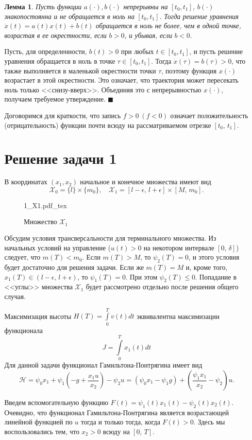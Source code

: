 \documentclass[16pt]{article}
\newcommand{\incfig}[2]{%
    \def\svgwidth{#2 mm}
    {#1.pdf_tex}
}
\newtheorem{Lem}{Лемма}
\newenvironment{Proof}{\par\noindent{\bf Доказательство.}}{\hfill$\scriptstyle\blacksquare$}
\newcommand\A{(\cdot)}
\newcommand\Int[2]{\int\limits_{#1}^{#2}}
\newcommand\X{\mathcal{X}}
\newcommand\Pict[3]{
\begin{figure}[h!]
    \centering
    \incfig{#1}{#3}
    \caption{#2}
    \label{fig:#1}
\end{figure}
}
\begin{document}
\begin{Lem}
Пусть функции $a\A, b\A$ непрерывны на $[t_0, t_1]$, $b\A$ знакопостоянна и не обращается в ноль на $[t_0, t_1]$.
Тогда решение уравнения $\dot{x}(t) = a(t)x(t) + b(t)$ обращается в ноль не более, чем в одной точке, возрастая в ее  окрестности, если $b > 0$, и убывая, если $b < 0$.
\end{Lem}
\begin{Proof}
Пусть, для определенности, $b(t) > 0$ при любых $t \in [t_0, t_1]$, и пусть решение уравнения обращается в ноль
в точке $\tau \in [t_0, t_1]$. Тогда $\dot{x}(\tau) = b(\tau) > 0$, что также выполняется в маленькой окрестности точки $\tau$, поэтому функция $x\A$ возрастает в этой окрестности.
Это означает, что траектория может пересекать ноль только <<снизу-вверх>>. Объединяя это с непрерывностью $x\A$,
получаем требуемое утверждение.
\end{Proof}

Договоримся для краткости, что запись $f > 0 \ (f < 0)$ означает положительность (отрицательность)
 функции почти всюду на рассматриваемом отрезке 
$[t_0,\,t_1]$.
\section{Решение задачи 1}
В координатах $(x_1, x_2)$ начальное и конечное множества имеют вид
$$\X_0 = \{l\} \times \{m_0\}, \quad \X_1 = [l-\epsilon, \, l+\epsilon] \times [M, \, m_0].$$
\Pict{1_X1}{Множество $\X_1$}{90}

Обсудим условия трансверсальности для терминального множества. Из начальных условий на управление ($u(t) > 0$ на 
некотором интервале $[0,\,\delta]$) следует, что $m(T) < m_0$. Если $m(T) > M$, то $\psi_2(T) = 0$, и этого условия
будет достаточно для решения задачи. Если же $m(T) = M$ и, кроме того, $x_1(T) \in (l-\epsilon,\, l+\epsilon)$, то
$\psi_1(T) = 0$. При этом $\psi_2(T) \leqslant 0$. Попадание в <<углы>> множества $\X_1$ будет рассмотрено отдельно
после решения общего случая.

Максимизация высоты $H(T) = \Int{0}{T}v(t)dt$ эквивалентна максимизации функционала $$J = \Int{0}{T}x_1(t)dt$$
Для данной задачи функционал Гамильтона-Понтрягина имеет вид 
$$\mathcal{H} = \psi_0x_1 + \psi_1\left(-g + \frac{x_1u}{x_2}\right) - \psi_2u = (\psi_0x_1 - \psi_1g) +
 \left(\frac{\psi_1x_1}{x_2} - \psi_2\right)u.$$

Введем вспомогательную функцию $F(t) = \psi_1(t)x_1(t) - \psi_2(t)x_2(t)$. Очевидно, что функционал 
Гамильтона-Понтрягина является возрастающей линейной функцией по $u$ тогда и только тогда, когда $F(t) > 0$.
Здесь мы воспользовались тем, что $x_2 > 0$ всюду на $[0,\,T]$.
 
\end{document}
